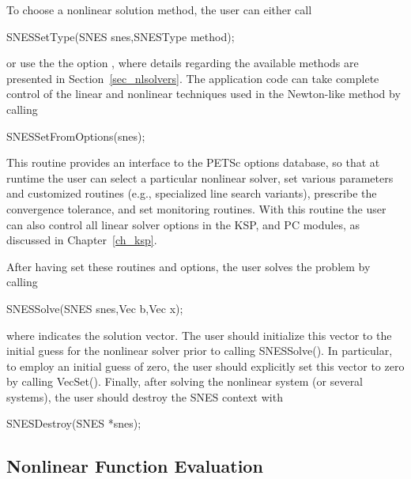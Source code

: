 To choose a nonlinear solution method, the user can either
call
\begin{tabbing}
  SNESSetType(SNES snes,SNESType method);
\end{tabbing}
or use the the option , 
where details regarding the available methods are presented in
Section~\ref{sec_nlsolvers}.
The application code can take complete control of the linear and
nonlinear techniques used in the Newton-like method by calling
\begin{tabbing}
  SNESSetFromOptions(snes);
\end{tabbing}
This routine provides an interface to the PETSc options database, so
that at runtime the user can select a particular nonlinear solver, set
various parameters and customized routines (e.g., specialized line
search variants), prescribe the convergence tolerance, and set
monitoring routines.  With this routine the user can also control all
linear solver options in the KSP, and PC modules, as discussed
in Chapter~\ref{ch_ksp}.

After having set these routines and options, the user
solves the problem by calling
\begin{tabbing}
  SNESSolve(SNES snes,Vec b,Vec x);
\end{tabbing}
where  indicates the solution vector. The user should
initialize this vector to the initial guess for the nonlinear solver
prior to calling SNESSolve().  In particular, to employ an
initial guess of zero, the user should explicitly set this vector to
zero by calling VecSet().  Finally, after solving the nonlinear
system (or several systems), the user should destroy the SNES context
with
\begin{tabbing}
  SNESDestroy(SNES *snes);
\end{tabbing}

\subsection{Nonlinear Function Evaluation}
\label{sec_snesfunction}

